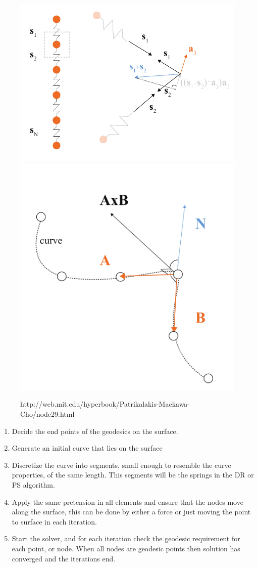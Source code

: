 \begin{figure}[H]
\centering
\includegraphics[width = 0.6\linewidth ]{figure/Method/GeodesicDyn.pdf}
\centering
\includegraphics[width = 0.35\linewidth ]{figure/Method/ChreckDR3.pdf}
\caption{http://web.mit.edu/hyperbook/Patrikalakis-Maekawa-Cho/node29.html}
\end{figure}


\vspace{5mm}


\begin{enumerate}
\item Decide the end points of the geodesics on the surface.
\item Generate an initial curve that lies on the surface
\item Discretize  the curve into segments, small enough to resemble the curve properties, of the same length. This segments will be the springs in the DR or PS algorithm.
\item Apply the same pretension in all elements and ensure that the nodes move along the surface, this can be done by either a force or just moving the point to surface in each iteration. 
\item Start the solver, and for each iteration check the geodesic requirement for each point, or node. When all nodes are geodesic points then solution has converged and the iterations end.
\end{enumerate}




